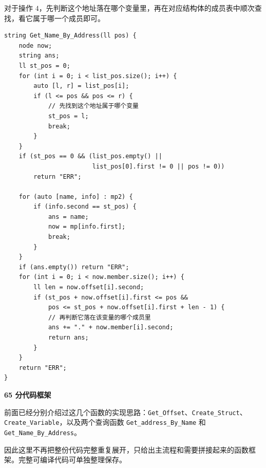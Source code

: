 \documentclass{book}
\newcommand{\code}[1]{\colorbox{codebg}{\texttt{#1}}}  %
\begin{document}
\newpage
    对于操作 $4$，先判断这个地址落在哪个变量里，再在对应结构体的成员表中顺次查找，看它属于哪一个成员即可。

    \begin{lstlisting}[style = code]
string Get_Name_By_Address(ll pos) {
    node now;
    string ans;
    ll st_pos = 0;
    for (int i = 0; i < list_pos.size(); i++) {
        auto [l, r] = list_pos[i];
        if (l <= pos && pos <= r) {
            // 先找到这个地址属于哪个变量
            st_pos = l;
            break;
        }
    }
    if (st_pos == 0 && (list_pos.empty() || 
                        list_pos[0].first != 0 || pos != 0))
        return "ERR";
        
    for (auto [name, info] : mp2) {
        if (info.second == st_pos) {
            ans = name;
            now = mp[info.first];
            break;
        }
    }
    if (ans.empty()) return "ERR";
    for (int i = 0; i < now.member.size(); i++) {
        ll len = now.offset[i].second;
        if (st_pos + now.offset[i].first <= pos &&
            pos <= st_pos + now.offset[i].first + len - 1) {
            // 再判断它落在该变量的哪个成员里
            ans += "." + now.member[i].second;
            return ans;
        }
    }
    return "ERR";
}\end{lstlisting}

\par\medskip
\noindent\textbf{65 分代码框架}
\par\medskip

前面已经分别介绍过这几个函数的实现思路：\code{Get\_Offset}、\code{Create\_Struct}、\code{Create\_Variable}，以及两个查询函数 \code{Get\_address\_By\_Name} 和 \code{Get\_Name\_By\_Address}。

因此这里不再把整份代码完整重复展开，只给出主流程和需要拼接起来的函数框架。完整可编译代码可单独整理保存。
\end{document}
